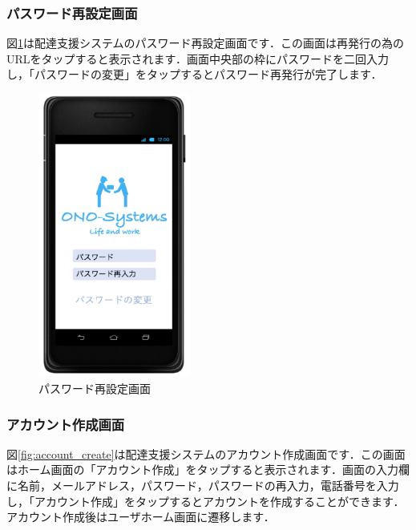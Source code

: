 \documentclass[a4j,titlepage]{jarticle}
\begin{document}
\subsubsection{パスワード再設定画面}
図\ref{fig:ps_change}は配達支援システムのパスワード再設定画面です．この画面は再発行の為のURLをタップすると表示されます．画面中央部の枠にパスワードを二回入力し，「パスワードの変更」をタップするとパスワード再発行が完了します．

\begin{figure}[htbp]
 \begin{center}
  \includegraphics[width=50mm]{ps_change.pdf}
	\caption{パスワード再設定画面}
	\label{fig:ps_change}
 \end{center}

\end{figure}

\subsubsection{アカウント作成画面}
図\ref{fig:account_create}は配達支援システムのアカウント作成画面です．この画面はホーム画面の「アカウント作成」をタップすると表示されます．画面の入力欄に名前，メールアドレス，パスワード，パスワードの再入力，電話番号を入力し，「アカウント作成」をタップするとアカウントを作成することができます．アカウント作成後はユーザホーム画面に遷移します．
\end{document}
